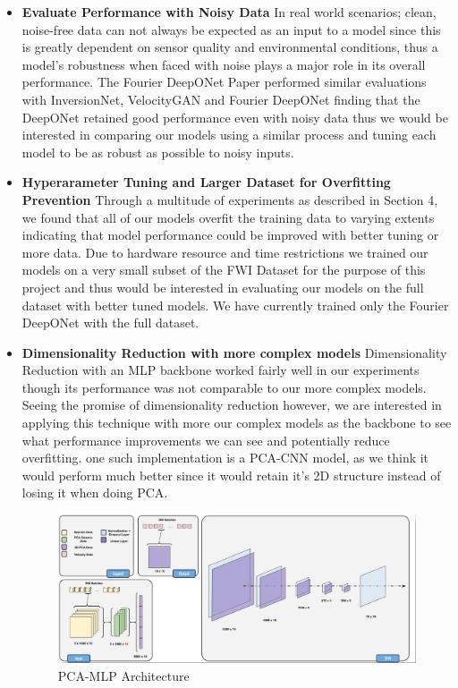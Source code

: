 \documentclass{article}
\begin{document}
\begin{itemize}
    \item \textbf{Evaluate Performance with Noisy Data} In real world scenarios; clean, noise-free data can not always be expected as an input to a model since this is greatly dependent on sensor quality and environmental conditions, thus a model's robustness when faced with noise plays a major role in its overall performance. The Fourier DeepONet Paper \cite{fdonet} performed similar evaluations with InversionNet, VelocityGAN and Fourier DeepONet finding that the DeepONet retained good performance even with noisy data thus we would be interested in comparing our models using a similar process and tuning each model to be as robust as possible to noisy inputs.
    \item \textbf{Hyperarameter Tuning and Larger Dataset for Overfitting Prevention} Through a multitude of experiments as described in Section 4, we found that all of our models overfit the training data to varying extents indicating that model performance could be improved with better tuning or more data. Due to hardware resource and time restrictions we trained our models on a very small subset of the FWI Dataset for the purpose of this project and thus would be interested in evaluating our models on the full dataset with better tuned models. We have currently trained only the Fourier DeepONet with the full dataset. 
    \item \textbf{Dimensionality Reduction with more complex models} Dimensionality Reduction with an MLP backbone worked fairly well in our experiments though its performance was not comparable to our more complex models. Seeing the promise of dimensionality reduction however, we are interested in applying this technique with more our complex models as the backbone to see what performance improvements we can see and potentially reduce overfitting. one such implementation is a PCA-CNN model, as we think it would perform much better since it would retain it's 2D structure instead of losing it when doing PCA.
    \begin{figure}[H]
    \centering
    \includegraphics[width=0.5\linewidth]{figures/conclusion1.png}
    \caption{PCA-MLP Architecture}
    \label{fig:conclusion1}
    \end{figure} 
\end{itemize}
\end{document}
